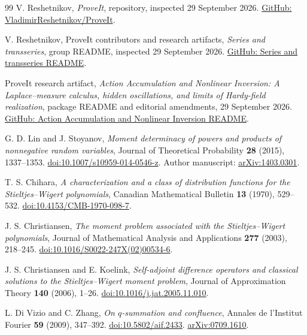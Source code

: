 \documentclass[11pt,a4paper]{article}
\numberwithin{equation}{section}
\theoremstyle{definition}
\theoremstyle{remark}
\begin{document}
\clearpage
\begin{thebibliography}{99}
V. Reshetnikov, \emph{ProveIt}, repository, inspected 29 September 2026.
\href{https://github.com/VladimirReshetnikov/ProveIt}{GitHub: VladimirReshetnikov/ProveIt}.

V. Reshetnikov, ProveIt contributors and research artifacts,
\emph{Series and transseries}, group README, inspected 29 September 2026.
\href{https://github.com/VladimirReshetnikov/ProveIt/blob/main/Analysis/Transseries/docs/series-and-transseries/README.md}{GitHub: Series and transseries README}.

ProveIt research artifact,
\emph{Action Accumulation and Nonlinear Inversion: A Laplace--measure
calculus, hidden oscillations, and limits of Hardy-field realization},
package README and editorial amendments, 29 September 2026.
\href{https://github.com/VladimirReshetnikov/ProveIt/blob/main/Analysis/Transseries/docs/series-and-transseries/Action_Accumulation_Nonlinear_Inversion/README.md}{GitHub: Action Accumulation and Nonlinear Inversion README}.

G. D. Lin and J. Stoyanov,
\emph{Moment determinacy of powers and products of nonnegative random
variables}, Journal of Theoretical Probability \textbf{28} (2015),
1337--1353.
\href{https://doi.org/10.1007/s10959-014-0546-z}{doi:10.1007/s10959-014-0546-z}.
Author manuscript: \href{https://arxiv.org/abs/1403.0301}{arXiv:1403.0301}.

T. S. Chihara, \emph{A characterization and a class of distribution
functions for the Stieltjes--Wigert polynomials}, Canadian Mathematical
Bulletin \textbf{13} (1970), 529--532.
\href{https://doi.org/10.4153/CMB-1970-098-7}{doi:10.4153/CMB-1970-098-7}.

J. S. Christiansen, \emph{The moment problem associated with the
Stieltjes--Wigert polynomials}, Journal of Mathematical Analysis and
Applications \textbf{277} (2003), 218--245.
\href{https://doi.org/10.1016/S0022-247X(02)00534-6}{doi:10.1016/S0022-247X(02)00534-6}.

J. S. Christiansen and E. Koelink,
\emph{Self-adjoint difference operators and classical solutions to the
Stieltjes--Wigert moment problem}, Journal of Approximation Theory
\textbf{140} (2006), 1--26.
\href{https://doi.org/10.1016/j.jat.2005.11.010}{doi:10.1016/j.jat.2005.11.010}.

L. Di Vizio and C. Zhang, \emph{On \(q\)-summation and confluence},
Annales de l'Institut Fourier \textbf{59} (2009), 347--392.
\href{https://doi.org/10.5802/aif.2433}{doi:10.5802/aif.2433}.
\href{https://arxiv.org/abs/0709.1610}{arXiv:0709.1610}.


\end{thebibliography}
\end{document}
